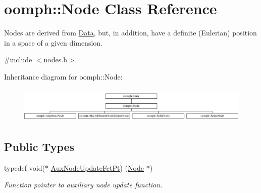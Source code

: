 \hypertarget{classoomph_1_1Node}{}\section{oomph\+:\+:Node Class Reference}
\label{classoomph_1_1Node}


Nodes are derived from \hyperlink{classoomph_1_1Data}{Data}, but, in addition, have a definite (Eulerian) position in a space of a given dimension.  




{\ttfamily \#include $<$nodes.\+h$>$}

Inheritance diagram for oomph\+:\+:Node\+:\begin{figure}[H]
\begin{center}
\leavevmode
\includegraphics[height=1.728395cm]{classoomph_1_1Node}
\end{center}
\end{figure}
\subsection*{Public Types}
\begin{DoxyCompactItemize}
\item 
typedef void($\ast$ \hyperlink{classoomph_1_1Node_afcc4cc3e1e48964baf23fa44c98293a9}{Aux\+Node\+Update\+Fct\+Pt}) (\hyperlink{classoomph_1_1Node}{Node} $\ast$)
\begin{DoxyCompactList}\small\item\em Function pointer to auxiliary node update function. \end{DoxyCompactList}\end{DoxyCompactItemize}
